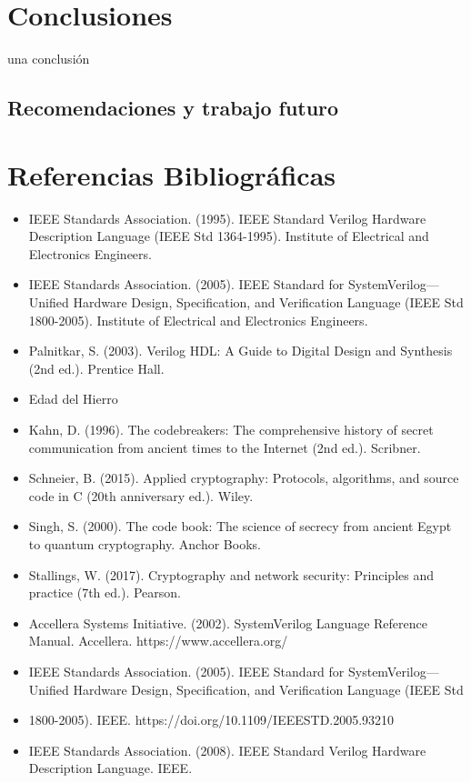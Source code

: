 
\chapter{Conclusiones}

una conclusi\'on

\section{Recomendaciones y trabajo futuro}

%
\chapter{Referencias Bibliográficas}
\begin{itemize}
\item IEEE Standards Association. (1995). IEEE Standard Verilog Hardware Description Language (IEEE Std 1364-1995). Institute of Electrical and Electronics Engineers.
\item IEEE Standards Association. (2005). IEEE Standard for SystemVerilog—Unified Hardware Design, Specification, and Verification Language (IEEE Std 1800-2005). Institute of Electrical and Electronics Engineers.
\item Palnitkar, S. (2003). Verilog HDL: A Guide to Digital Design and Synthesis (2nd ed.). Prentice Hall.
\item Edad del Hierro
\item Kahn, D. (1996). The codebreakers: The comprehensive history of secret communication from ancient times to the Internet (2nd ed.). Scribner.
\item Schneier, B. (2015). Applied cryptography: Protocols, algorithms, and source code in C (20th anniversary ed.). Wiley.
\item Singh, S. (2000). The code book: The science of secrecy from ancient Egypt to quantum cryptography. Anchor Books.
\item Stallings, W. (2017). Cryptography and network security: Principles and practice (7th ed.). Pearson.
\item	Accellera Systems Initiative. (2002). SystemVerilog Language Reference Manual. Accellera. https://www.accellera.org/
\item IEEE Standards Association. (2005). IEEE Standard for SystemVerilog—Unified Hardware Design, Specification, and Verification Language (IEEE Std 
\item 1800-2005). IEEE. https://doi.org/10.1109/IEEESTD.2005.93210
\item IEEE Standards Association. (2008). IEEE Standard Verilog Hardware Description Language. IEEE.

\end{itemize}
